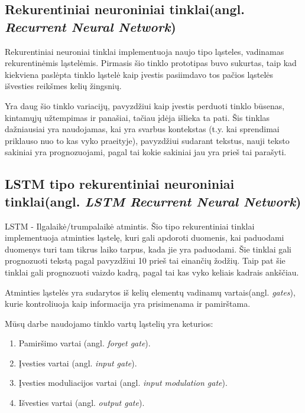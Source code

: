 \subsection{Rekurentiniai neuroniniai tinklai(angl. \textit{Recurrent Neural Network})}

Rekurentiniai neuroniai tinklai implementuoja naujo tipo ląsteles, vadinamas rekurentinėmis ląstelėmis. Pirmasis šio tinklo prototipas buvo sukurtas, taip kad kiekviena paslėpta tinklo ląstelė kaip įvestis pasiimdavo tos pačios ląstelės išvesties reikšmes kelių žingsnių.

Yra daug šio tinklo variacijų, pavyzdžiui kaip įvestis perduoti tinklo būsenas, kintamųjų užtempimas ir panašiai, tačiau įdėja išlieka ta pati. Šis tinklas dažniausiai yra naudojamas, kai yra svarbus kontekstas (t.y. kai sprendimai priklauso nuo to kas vyko praeityje), pavyzdžiui sudarant tekstus, nauji teksto sakiniai yra prognozuojami, pagal tai kokie sakiniai jau yra prieš tai parašyti.


\subsection{ LSTM tipo rekurentiniai neuroniniai tinklai(angl. \textit{LSTM Recurrent Neural Network})}

LSTM - Ilgalaikė/trumpalaikė atmintis. Šio tipo rekurentiniai tinklai implementuoja atminties ląstelę, kuri gali apdoroti duomenis, kai paduodami duomenys turi tam tikrus laiko tarpus, kada jie yra paduodami. Šie tinklai gali prognozuoti tekstą pagal pavyzdžiui 10 prieš tai einančių žodžių. Taip pat šie tinklai gali prognozuoti vaizdo kadrą, pagal tai kas vyko keliais kadrais ankščiau. \cite{Christopher2015}

Atminties ląstelės yra sudarytos iš kelių elementų vadinamų vartais(angl. \textit{gates}), kurie kontroliuoja kaip informacija yra prisimenama ir pamirštama.

Mūsų darbe naudojamo tinklo vartų ląstelių yra keturios:
\begin{enumerate}
  \item Pamiršimo vartai (angl. \textit{forget gate}).
  \item Įvesties vartai (angl. \textit{input gate}).
  \item Įvesties moduliacijos vartai (angl. \textit{input modulation gate}).
  \item Išvesties vartai (angl. \textit{output gate}).
\end{enumerate}

